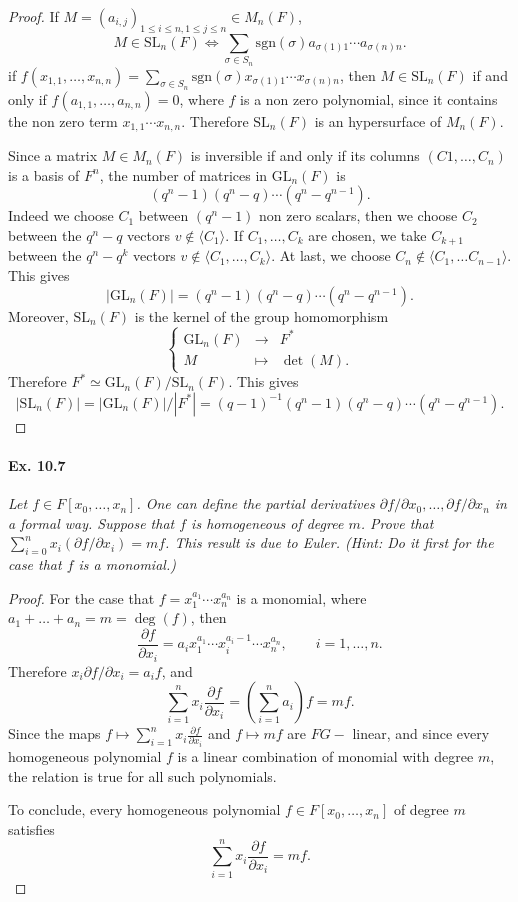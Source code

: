 \documentclass[11pt,a4paper]{article}
\begin{document}
\begin{proof}
If $M = (a_{i,j})_{1\leq i \leq n, 1\leq j \leq n} \in M_n(F)$, 
$$M \in \mathrm{SL}_n(F) \iff \sum_{\sigma \in S_n} \mathrm{sgn}(\sigma) a_{\sigma(1)1}\cdots a_{\sigma(n)n}.$$
if $f(x_{1,1},\ldots,x_{n,n}) = \sum\limits_{\sigma \in S_n} \mathrm{sgn}(\sigma) x_{\sigma(1)1}\cdots x_{\sigma(n)n}$, then  $M \in \mathrm{SL}_n(F)$ if and only if ${f(a_{1,1}, \ldots,a_{n,n}) = 0}$, where $f$ is a non zero polynomial, since it contains the non zero term $x_{1,1}\cdots x_{n,n}$. Therefore $\mathrm{SL}_n(F)$ is an hypersurface of $M_n(F)$.

Since a matrix $M \in M_n(F)$ is inversible if and only if its columns $(C1,\ldots,C_n)$ is a basis of $F^n$, the number of matrices in $\mathrm{GL}_n(F)$ is $$(q^n-1)(q^n-q)\cdots(q^n-q^{n-1}).$$Indeed we choose $C_1$ between $(q^n-1)$ non zero scalars, then we choose $C_2$ between the $q^n-q$ vectors $v  \not \in \langle C_1 \rangle$. If $C_1,\ldots,C_k$ are chosen, we take $C_{k+1}$ between the $q^n -q^k$ vectors $v \not \in \langle C_1,\ldots,C_k \rangle$. At last, we choose $C_n \not \in \langle C_1,\ldots C_{n-1}\rangle$. This gives
$$|\mathrm{GL}_n(F)| = (q^n-1)(q^n-q)\cdots(q^n-q^{n-1}).$$
Moreover, $\mathrm{SL}_n(F)$ is the kernel of the group homomorphism
$$
\left\{
\begin{array}{ccl}
\mathrm{GL}_n(F) & \to & F^*\\
M & \mapsto &\det(M).
\end{array}
\right.
$$
Therefore $F^* \simeq \mathrm{GL}_n(F)/\mathrm{SL}_n(F)$. This gives
$$|\mathrm{SL}_n(F)| = |\mathrm{GL}_n(F)|/ |F^*| = (q-1)^{-1}(q^n-1)(q^n-q)\cdots(q^n-q^{n-1}).$$
\end{proof}

\paragraph{Ex. 10.7} {\it Let $f \in F[x_0,\ldots,x_n]$. One can define the partial derivatives $\partial f/\partial x_0, \ldots,\partial f/ \partial x_n$ in a formal way. Suppose that $f$ is homogeneous of degree $m$. Prove that $\sum_{i=0}^n x_i (\partial f/ \partial x_i) = mf$. This result is due to Euler. (Hint: Do it first for the case that $f$ is a monomial.)
}
\begin{proof}
For the case that $f = x_1^{a_1}\cdots x_n^{a_n}$ is a monomial, where $a_1+ \ldots + a_n = m = \deg(f)$, then
$$\frac{\partial f}{\partial x_i} = a_i x_1^{a_1}\cdots x_i^{a_i - 1}\cdots x_n^{a_n}, \qquad i=1,\ldots,n.$$
Therefore $x_i \partial f/ \partial x_i = a_i f$, and
$$\sum_{i=1}^n x_i \frac{\partial f}{\partial x_i}  =\left (\sum_{i=1}^n a_i \right ) f = m f.$$
Since the maps $f \mapsto \sum_{i=1}^n x_i \frac{\partial f}{\partial x_i} $ and $f \mapsto mf$ are $FG-$ linear, and since every homogeneous polynomial $f$ is a linear combination of monomial with degree $m$, the relation is true for all such polynomials.

To conclude, every homogeneous polynomial $f \in F[x_0,\ldots,x_n]$ of degree $m$ satisfies
$$\sum_{i=1}^n x_i \frac{\partial f}{\partial x_i}  = m f.$$
\end{proof}
\end{document}
